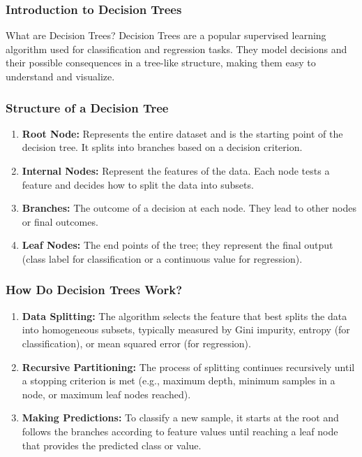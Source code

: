 \documentclass[aspectratio=169]{beamer}
\begin{document}
\begin{frame}[fragile]
    \frametitle{Introduction to Decision Trees}
    \begin{block}{What are Decision Trees?}
        Decision Trees are a popular supervised learning algorithm used for classification and regression tasks. 
        They model decisions and their possible consequences in a tree-like structure, making them easy to understand and visualize.
    \end{block}
\end{frame}

\begin{frame}[fragile]
    \frametitle{Structure of a Decision Tree}
    \begin{enumerate}
        \item \textbf{Root Node:} Represents the entire dataset and is the starting point of the decision tree. It splits into branches based on a decision criterion.
        \item \textbf{Internal Nodes:} Represent the features of the data. Each node tests a feature and decides how to split the data into subsets.
        \item \textbf{Branches:} The outcome of a decision at each node. They lead to other nodes or final outcomes.
        \item \textbf{Leaf Nodes:} The end points of the tree; they represent the final output (class label for classification or a continuous value for regression).
    \end{enumerate}
\end{frame}

\begin{frame}[fragile]
    \frametitle{How Do Decision Trees Work?}
    \begin{enumerate}
        \item \textbf{Data Splitting:} The algorithm selects the feature that best splits the data into homogeneous subsets, typically measured by Gini impurity, entropy (for classification), or mean squared error (for regression).
        \item \textbf{Recursive Partitioning:} The process of splitting continues recursively until a stopping criterion is met (e.g., maximum depth, minimum samples in a node, or maximum leaf nodes reached).
        \item \textbf{Making Predictions:} To classify a new sample, it starts at the root and follows the branches according to feature values until reaching a leaf node that provides the predicted class or value.
    \end{enumerate}
\end{frame}
\end{document}
